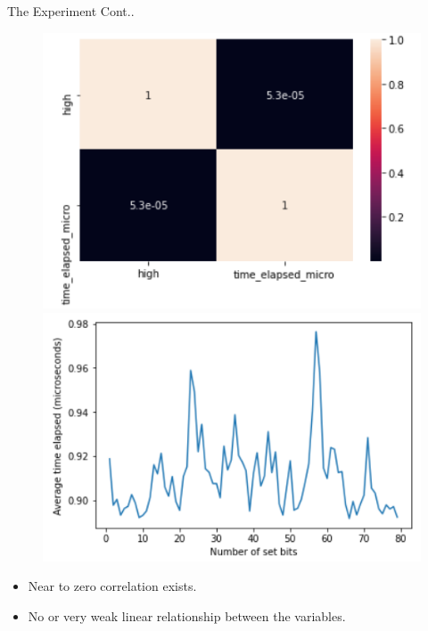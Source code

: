 \begin{frame}{The Experiment Cont..}
\begin{center}
        \begin{figure}[h!]
              \includegraphics[width=0.8\linewidth]{heatmap.PNG}
            \endminipage\hfill
              \includegraphics[width=0.8\linewidth]{lineplot.PNG}
            \endminipage
        \end{figure}
    \end{center}
\begin{itemize}
    \item Near to zero correlation exists.
    \item No or very weak linear relationship between the variables.
\end{itemize}
\end{frame}